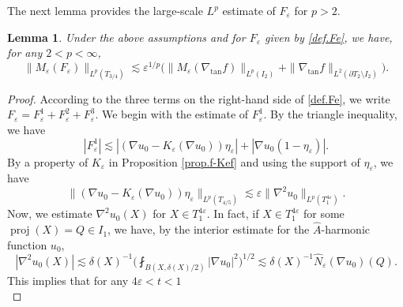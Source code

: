 \documentclass[reqno,12pt]{amsart} %
\newtheorem{lemma}[theorem]{Lemma}
\theoremstyle{definition}
\theoremstyle{remark}
\numberwithin{equation}{section}
\newcommand{\e}{\varepsilon}
\DeclareMathOperator{\dist}{dist}
\DeclareMathOperator{\proj}{proj}
\begin{document}
The next lemma provides the large-scale $L^p$ estimate of $F_\e$ for $p>2$.

\begin{lemma}\label{lem.weLp}
Under the above assumptions and for $F_\e$ given by \eqref{def.Fe}, we have, for any $2<p<\infty$,
\begin{equation}\label{est.MeFe}
    \| M_\e(F_\e) \|_{L^p(T_{3/4})} \lesssim \e^{1/p} \big( \| M_\e(\nabla_{\tan} f) \|_{L^p(I_2)} + \| \nabla_{\tan} f \|_{L^2(\partial T_2 \setminus I_2)} \big).
\end{equation}
\end{lemma}

\begin{proof}
According to the three terms on the right-hand side of \eqref{def.Fe}, we write $F_\e = F_\e^{1} + F_\e^2 + F_\e^3$.
We begin with the estimate of $F_\e^1$.
By the triangle inequality, we have
\begin{equation}\label{def.Fe1}
    |F_\e^1| \lesssim |(\nabla u_0 - K_\e(\nabla u_0)) \eta_\e| + |\nabla u_0 (1-\eta_\e)|.
\end{equation}
By a property of $K_\e$ in Proposition \ref{prop.f-Kef} and using the support of $\eta_\e$, we have
\begin{equation}\label{est.Du0-KeDu0}
    \| (\nabla u_0 - K_\e(\nabla u_0)) \eta_\e \|_{L^p(T_{4/5})} \lesssim \e \| \nabla^2 u_0 \|_{L^p(T_{1}^{4\e})}.
\end{equation}
Now, we estimate $\nabla^2 u_0(X)$ for $X\in T_{1}^{4\e}$. 
In fact, if $X \in  T_{1}^{4\e}$ for some $\proj(X) = Q\in I_1$, we have, by the interior estimate for the $\widehat{A}$-harmonic function $u_0$,
\begin{equation}
    |\nabla^2 u_0(X)| \lesssim \delta(X)^{-1} \bigg( \fint_{B(X,\delta(X)/2)} |\nabla u_0|^2 \bigg)^{1/2} \lesssim \delta(X)^{-1} \widehat{N}_\e(\nabla u_0)(Q).
\end{equation}
This implies that for any $4\e < t < 1$
\begin{equation}

\end{equation}
\end{proof}
\end{document}
